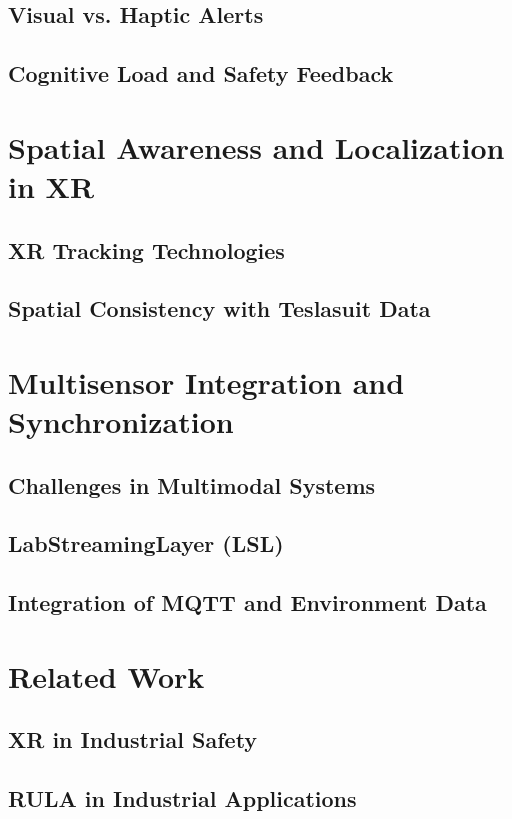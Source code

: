 \subsection{Visual vs. Haptic Alerts}

\subsection{Cognitive Load and Safety Feedback}

\section{Spatial Awareness and Localization in XR}
\subsection{XR Tracking Technologies}

\subsection{Spatial Consistency with Teslasuit Data}

\section{Multisensor Integration and Synchronization}
\subsection{Challenges in Multimodal Systems}

\subsection{LabStreamingLayer (LSL)}

\subsection{Integration of MQTT and Environment Data}

\section{Related Work}
\subsection{XR in Industrial Safety}
\subsection{RULA in Industrial Applications}
